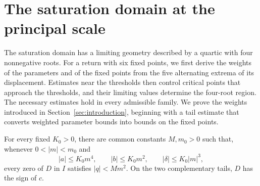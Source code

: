 \section{The saturation domain at the principal scale}\label{sec:main-saturation}
\label{sat:section}

The saturation domain has a limiting geometry described by a quartic with
four nonnegative roots. For a return with six fixed points, we first derive
the weights of the parameters and of the fixed points from the five
alternating extrema of its displacement. Estimates near the thresholds then
control critical points that
approach the thresholds, and their limiting values determine the four-root
region. The necessary estimates hold in every admissible family. We prove the
weights introduced in Section~\ref{sec:introduction}, beginning with
a tail estimate that converts weighted parameter bounds into bounds on the
fixed points.

\begin{lemma}\label{mainloc:tail}
For every fixed $K_0>0$, there are common constants $M,m_0>0$ such
that, whenever $0<|m|<m_0$ and
\[
 |a|\le K_0m^4,\qquad |b|\le K_0m^2,\qquad
 |\delta|\le K_0|m|^3,
\]
every zero of $D$ in $I$ satisfies $|q|<Mm^2$. On the two complementary
tails, $D$ has the sign of $c$.
\end{lemma}

